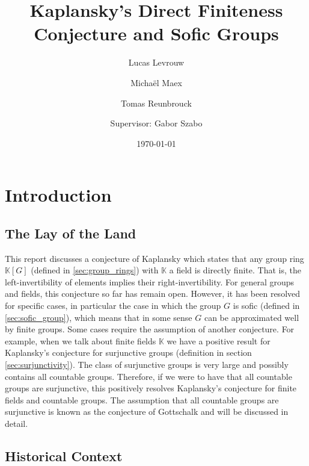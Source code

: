 \documentclass[titlepage, a4paper]{article}
\author{Lucas Levrouw \and Michaël Maex \and Tomas Reunbrouck \and Supervisor: Gabor Szabo}
\title{Kaplansky's Direct Finiteness Conjecture and Sofic Groups}
\date{\today}
\theoremstyle{theoremdd}
\theoremstyle{definition}
\theoremstyle{remark}
\begin{document}
    \maketitle
\begingroup
  \pagestyle{empty}
  \null
  \newpage
\endgroup
{}
\tableofcontents
\pagebreak



\section{Introduction}\label{sec:intro}

\subsection*{The Lay of the Land}

This report discusses a conjecture of Kaplansky which states that any group ring $\mathbb{K}[G]$ (defined in \cref{sec:group_rings}) with $\mathbb{K}$ a field is directly finite. That is, the left-invertibility of elements implies their right-invertibility. For general groups and fields, this conjecture so far has remain open. However, it has been resolved for specific cases, in particular the case in which the group $G$ is sofic (defined in \cref{sec:sofic_group}), which means that in some sense $G$ can be approximated well by finite groups. Some cases require the assumption of another conjecture. For example, when we talk about finite fields $\mathbb{K}$ we have a positive result for Kaplansky’s conjecture for surjunctive groups (definition in section \ref{sec:surjunctivity}). The class of surjunctive groups is very large and possibly contains all countable groups. Therefore, if we were to have that all countable groups are surjunctive, this positively resolves Kaplansky's conjecture for finite fields and countable groups.
The assumption that all countable groups are surjunctive is known as the conjecture of Gottschalk and will be discussed in detail.

\subsection*{Historical Context}
\end{document}
